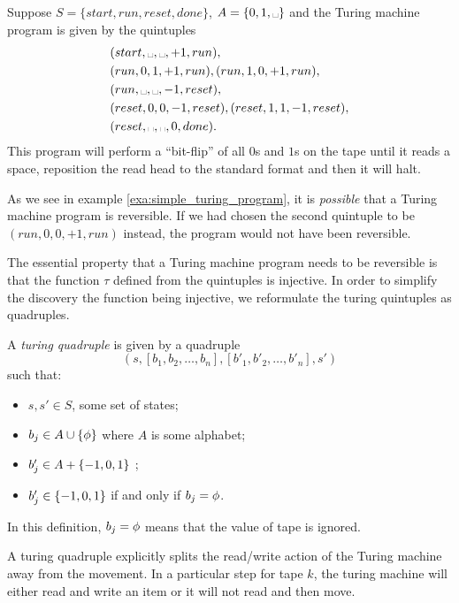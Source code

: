 \begin{example}\label{exa:simple_turing_program}
  Suppose $S=\{start,run,reset,done\}$, $A=\{0,1,\blank\}$ and the Turing machine
  program is given by the quintuples
  \begin{align*}
    &(start,\blank,\blank,+1,run),\\
    &(run,0,1,+1,run), (run,1,0,+1,run),\\
    &(run,\blank,\blank,-1,reset),\\
    &(reset,0,0,-1,reset),(reset,1,1,-1,reset),\\
    &(reset,\blank,\blank,0,done).
  \end{align*}
  This program will perform a ``bit-flip'' of all $0$s and $1$s on the tape
  until it reads a space, reposition the read head to the standard format
  and then it will halt.
\end{example}

As we see in example \vref{exa:simple_turing_program}, it is \emph{possible}
that a Turing machine program is reversible. If we had chosen the second
quintuple to be $(run,0,0,+1,run)$ instead, the program would not have been
reversible.

The essential property that a Turing machine program needs to be reversible
is that the function $\tau$ defined from the quintuples is injective. In order
to simplify the discovery the function being injective, we reformulate the
turing quintuples as quadruples.

\begin{definition}\label{def:turing_quadruple}
  A \emph{turing quadruple} is given by a quadruple
  \[(s,[b_1,b_2,\ldots,b_n],[b'_1,b'_2,\ldots,b'_n],s')\]
  such that:
  \begin{itemize}
    \item $s,s'\in S$, some set of states;
    \item $b_j\in A  \cup \{\phi\}$ where $A$ is some alphabet;
    \item $b'_j\in A  + \{-1,0,1\}$ ;
    \item $b'_j \in \{-1,0,1\}$ if and only if $b_j = \phi$.
  \end{itemize}
  In this definition, $b_j = \phi$ means that the value of tape
  \jay is ignored.
\end{definition}

A turing quadruple explicitly splits the read/write action of the
Turing machine away from the movement. In a particular step for
tape $k$, the
turing machine will either read and write an item or it will not
read and then move.

